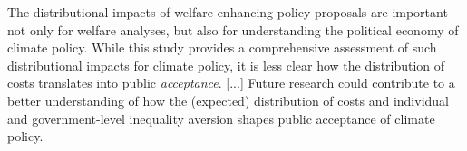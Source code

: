 \documentclass[11pt]{article}
\begin{document}
\begin{revisionbox}
    The distributional impacts of welfare-enhancing policy proposals are important not only for welfare analyses, but also for understanding the political economy of climate policy. While this study provides a comprehensive assessment of such distributional impacts for climate policy, it is less clear how the distribution of costs translates into public \textit{acceptance}. [...] Future research could contribute to a better understanding of how the (expected) distribution of costs and individual and government-level inequality aversion shapes public acceptance of climate policy. 
\end{revisionbox}

\clearpage

\clearpage
\end{document}
